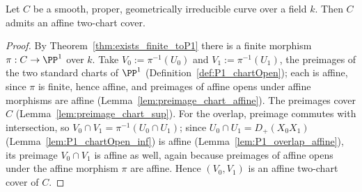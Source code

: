 \begin{theorem}
  \label{thm:AffineTwoCover_nonempty_of_curve}
  \leanok
  Let \(C\) be a smooth, proper, geometrically irreducible curve over a field \(k\). Then \(C\)
  admits an affine two-chart cover.
\end{theorem}
\begin{proof}
  \leanok
  By Theorem~\ref{thm:exists_finite_toP1} there is a finite morphism \(\pi : C \to \PP^1\) over
  \(k\). Take \(V_0 := \pi^{-1}(U_0)\) and \(V_1 := \pi^{-1}(U_1)\), the preimages of the two
  standard charts of \(\PP^1\) (Definition~\ref{def:P1_chartOpen}); each is affine, since \(\pi\)
  is finite, hence affine, and preimages of affine opens under affine morphisms are affine
  (Lemma~\ref{lem:preimage_chart_affine}). The preimages cover \(C\)
  (Lemma~\ref{lem:preimage_chart_sup}). For the overlap, preimage commutes with intersection, so
  \(V_0 \cap V_1 = \pi^{-1}(U_0 \cap U_1)\); since \(U_0 \cap U_1 = D_+(X_0X_1)\)
  (Lemma~\ref{lem:P1_chartOpen_inf}) is affine (Lemma~\ref{lem:P1_overlap_affine}), its preimage
  \(V_0 \cap V_1\) is affine as well, again because preimages of affine opens under the affine
  morphism \(\pi\) are affine. Hence \((V_0, V_1)\) is an affine two-chart cover of \(C\).
\end{proof}


